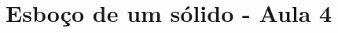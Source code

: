 \documentclass[12pt, a4paper]{article}
\begin{document}
		\section{Esboço de um sólido - Aula 4}
			
	
			
			
			
			
			
			
	
			
			
\end{document}
